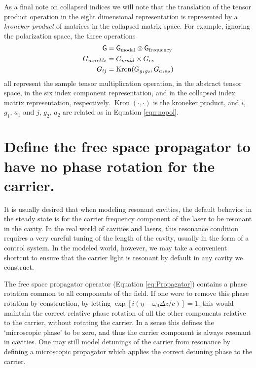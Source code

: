 As a final note on collapsed indices we will note that the translation of the tensor product operation in the eight dimensional representation is represented by a \emph{kroneker product} of matrices in the collapsed matrix space. %
For example, ignoring the polarization space, the three operations
\begin{align*}
\mathsf{G}&=\mathsf{G}_{\text{modal}}\otimes \mathsf{G}_{\text{frequency}}\\
G_{mnrkls}&=G_{mnkl}\times G_{rs}\\
G_{ij}&=\operatorname{Kron}(G_{g_1g_2},G_{a_1a_2})
\end{align*}
all represent the sample tensor multiplication operation, in the abstract tensor space, in the six index component representation, and in the collapsed index matrix representation, respectively. %
$\operatorname{Kron}(\cdot,\cdot)$ is the kroneker product, and $i$, $g_1$, $a_1$ and $j$, $g_2$, $a_2$ are related as in Equation \ref{eqn:nopol}.

\section{Define the free space propagator to have no phase rotation for the  carrier.}

It is usually desired that when modeling resonant cavities, the default behavior in the steady state is for the carrier frequency component of the laser to be resonant in the cavity. %
In the real world of cavities and lasers, this resonance condition requires a very careful tuning of the length of the cavity, usually in the form of a control system. %
In the modeled world, however, we may take a convenient shortcut to ensure that the carrier light is resonant by default in any cavity we construct.

The free space propagator operator (Equation \ref{eq:Propagator}) contains a phase rotation common to all components of the field. %
If one were to remove this phase rotation by construction, by letting $\exp[i(\eta - \omega_0 \Delta z/c)]=1$, this would maintain the correct relative phase rotation of all the other components relative to the carrier, without rotating the carrier. %
In a sense this defines the `microscopic phase' to be zero, and thus the  carrier component is always resonant in cavities. %
One may still model detunings of the carrier from resonance by defining a microscopic propagator which applies the correct detuning phase to the carrier.

